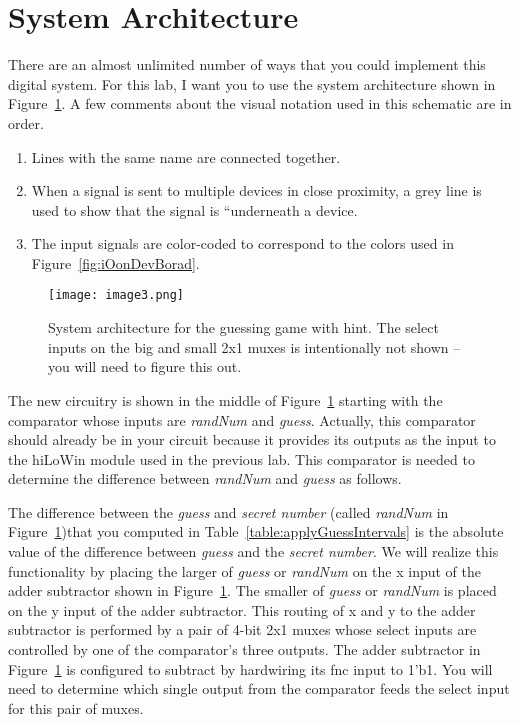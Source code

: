 \section{System Architecture}

There are an almost unlimited number of ways that you could implement
this digital system. For this lab, I want you to use the system
architecture shown in Figure~\ref{fig:guessWithHintSystemArch}. A few 
comments about the visual notation
used in this schematic are in order.

\begin{enumerate}
\def\labelenumi{\arabic{enumi})}
\item
  Lines with the same name are connected together.
\item
  When a signal is sent to multiple devices in close proximity, a grey
  line is used to show that the signal is ``underneath a device.
\item
  The input signals are color-coded to correspond to the colors used in
  Figure~\ref{fig:iOonDevBorad}.
\end{enumerate}

\begin{figure}[ht]
\texttt{[image:  image3.png]}
\caption{System architecture for the guessing game with hint. The select
inputs on the big and small 2x1 muxes is intentionally not shown -- you
will need to figure this out.}
\label{fig:guessWithHintSystemArch}
\end{figure}

The new circuitry is shown in the middle of Figure~\ref{fig:guessWithHintSystemArch} starting with the
comparator whose inputs are \emph{randNum} and \emph{guess}. Actually,
this comparator should already be in your circuit because it provides
its outputs as the input to the hiLoWin module used in the previous lab.
This comparator is needed to determine the difference between
\emph{randNum} and \emph{guess} as follows.

The difference between the \emph{guess} and \emph{secret number} (called
\emph{randNum} in Figure~\ref{fig:guessWithHintSystemArch})that you computed 
in Table~\ref{table:applyGuessIntervals} is 
the absolute
value of the difference between \emph{guess} and the \emph{secret
number}. We will realize this functionality by placing the larger of
\emph{guess} or \emph{randNum} on the x input of the adder subtractor
shown in Figure~\ref{fig:guessWithHintSystemArch}. The smaller of \emph{guess} or \emph{randNum} is
placed on the y input of the adder subtractor. This routing of x and y
to the adder subtractor is performed by a pair of 4-bit 2x1 muxes whose
select inputs are controlled by one of the comparator's three outputs.
The adder subtractor in Figure~\ref{fig:guessWithHintSystemArch} is configured to subtract by hardwiring
its fnc input to 1'b1. You will need to determine which single output
from the comparator feeds the select input for this pair of muxes.

